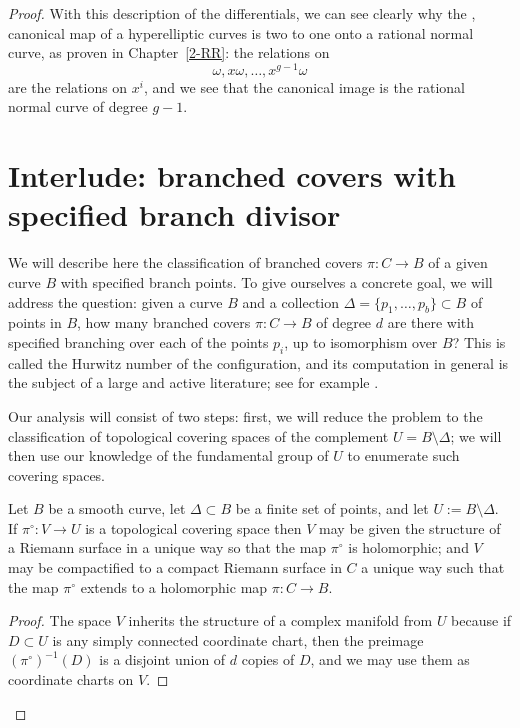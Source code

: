 \begin{proof}
With this description of the differentials, we can see clearly why the , canonical map of a hyperelliptic curves is two to one onto a rational normal curve, as proven in Chapter~\ref{2-RR}:
the relations on 
$$
\omega, x\omega, \dots, x^{g-1}\omega
$$
are the relations on $x^i$, and we see that the canonical image is the rational normal curve of degree $g-1$.


\section{Interlude: branched covers with specified branch divisor}\label{branched covers}
   

We will describe here the classification of branched covers $\pi : C \to B$ of a given curve $B$ with specified branch points. To give ourselves a concrete goal, we will address the question: given a curve $B$ and a collection $\Delta = \{p_1,\dots,p_b\} \subset B$ of points in $B$, how many branched covers $\pi : C \to B$ of degree $d$ are there with specified branching over each of the points $p_i$, up to isomorphism over $B$? This is called
the Hurwitz number of the configuration, and its computation in general is the subject of a large and active literature; see for example
\cite{ELSV}.

Our analysis will consist of two steps: first, we will reduce the problem to the classification of topological covering spaces of the complement $U = B \setminus \Delta$; we will then use our knowledge of the fundamental group of $U$ to enumerate such covering spaces.
   
\begin{theorem}
 Let $B$ be a smooth curve, let $\Delta\subset B$ be a finite set of points, and let $U := B\setminus \Delta$.
If $\pi^\circ : V \to U$ is a topological covering space then $V$ may be given the structure of a Riemann surface in a unique way so that the map $\pi^\circ$ is holomorphic; and $V$ may be compactified to a compact Riemann surface in $C$ a unique way such that the map $\pi^\circ$ extends to a holomorphic map $\pi : C \to B$.
\end{theorem} 

\begin{proof}
The space $V$ inherits the structure of a complex manifold from $U$ because if $D \subset U$ is any simply connected coordinate chart, then the preimage $({\pi^\circ})^{-1}(D)$ is a disjoint union of $d$ copies of $D$, and we may use them as coordinate charts on $V$. 
   

\end{proof}
\end{proof}
